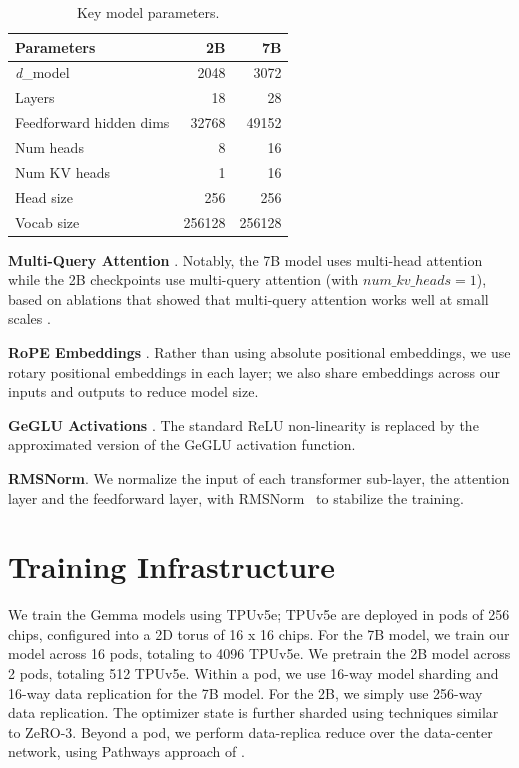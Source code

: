 \documentclass[11pt, a4paper, logo, twocolumn, copyright, nonumbering]{googledeepmind}
\begin{document}
\begin{table}
    \centering
    \begin{tabular}{l r r}
    \toprule
        Parameters & \textbf{2B} & \textbf{7B} \\
        \midrule
        \textit{d}\_{model} & 2048 & 3072 \\
        Layers & 18 & 28 \\
        Feedforward hidden dims & 32768 & 49152 \\
        Num heads & 8 & 16 \\
        Num KV heads & 1 & 16 \\
        Head size & 256 & 256 \\
        Vocab size & 256128 & 256128 \\
    \bottomrule
    \end{tabular}
    \caption{Key model parameters.}
    \label{tab:model_params}
\end{table}



\noindent\textbf{Multi-Query Attention} \citep{mqa}. 
Notably, the 7B model uses multi-head attention while the 2B checkpoints use multi-query attention (with $num\_kv\_heads = 1$), based on ablations that showed that multi-query attention works well at small scales \citep{mqa}. 

\noindent\textbf{RoPE Embeddings} \citep{rope}. Rather than using absolute positional embeddings, we use rotary positional embeddings in each layer; we also share embeddings across our inputs and outputs to reduce model size.

\noindent\textbf{GeGLU Activations} \citep{geglu}. The standard ReLU non-linearity is replaced by the approximated version of the GeGLU activation function.

\noindent\textbf{RMSNorm}. We normalize the input of each transformer sub-layer, the attention layer and the feedforward layer, with RMSNorm~\citep{rmsnorm} to stabilize the training.

\section{Training Infrastructure}

We train the Gemma models using TPUv5e; TPUv5e are deployed in pods of 256 chips, configured into a 2D torus of 16 x 16 chips. For the 7B model, we train our model across 16 pods, totaling to 4096 TPUv5e. 
We pretrain the 2B model across 2 pods, totaling 512 TPUv5e. 
Within a pod, we use 16-way model sharding and 16-way data replication for the 7B model. 
For the 2B, we simply use 256-way data replication. 
The optimizer state is further sharded using techniques similar to ZeRO-3. 
Beyond a pod, we perform data-replica reduce over the data-center network, using Pathways approach of \citep{barham2022pathways}.
\end{document}
